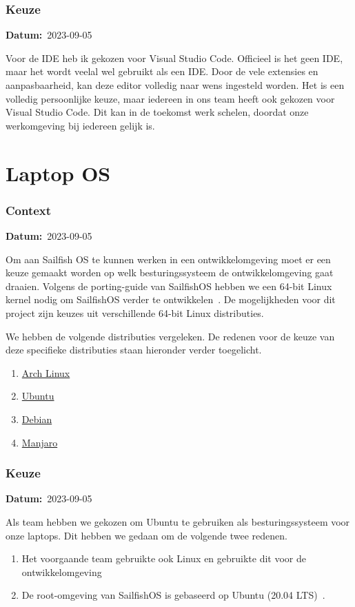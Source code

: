 \documentclass[a4paper]{report}
\newcommand{\personalbox}{
  \begin{tcolorbox}[hbox, colback=green!5!white,colframe=green!75!black,
    left=.1mm, right=.1mm, top=.1mm, bottom=.1mm, fontupper=\scriptsize\sffamily]
    Persoonlijke Keuze
  \end{tcolorbox}
}
\newcommand{\personalchoice}[1]{
  \section[ #1 ]{#1~\mbox{\raisebox{-2.5pt}{\personalbox}}}
}
\newcommand{\timestamp}[1]{
  \mbox{\scriptsize \textbf{Datum:} #1} \smallbreak
}
\begin{document}
\subsubsection{Keuze}
\timestamp{2023-09-05}
Voor de IDE heb ik gekozen voor Visual Studio Code. Officieel is het geen IDE, maar het wordt veelal wel gebruikt als een IDE. 
Door de vele extensies en aanpasbaarheid, kan deze editor volledig naar wens ingesteld worden. 
Het is een volledig persoonlijke keuze, maar iedereen in ons team heeft ook gekozen voor Visual Studio Code.
Dit kan in de toekomst werk schelen, doordat onze werkomgeving bij iedereen gelijk is.

\personalchoice{Laptop OS}
\subsubsection{Context}
\timestamp{2023-09-05}
Om aan Sailfish OS te kunnen werken in een ontwikkelomgeving moet er een keuze gemaakt worden op welk besturingssysteem de ontwikkelomgeving gaat draaien. 
Volgens de porting-guide van SailfishOS hebben we een 64-bit Linux kernel nodig om SailfishOS verder te ontwikkelen~\cite{sailfishportingguide}.
De mogelijkheden voor dit project zijn keuzes uit verschillende 64-bit Linux distributies. 

We hebben de volgende distributies vergeleken. De redenen voor de keuze van deze specifieke distributies staan hieronder verder toegelicht.
\begin{enumerate}
  \item \href{https://archlinux.org/}{Arch Linux}
  \item \href{https://ubuntu.com/}{Ubuntu}
  \item \href{https://www.debian.org/}{Debian}
  \item \href{https://manjaro.org/}{Manjaro}
\end{enumerate}


\subsubsection{Keuze}
\timestamp{2023-09-05}
Als team hebben we gekozen om Ubuntu te gebruiken als besturingssysteem voor onze laptops. 
Dit hebben we gedaan om de volgende twee redenen.
\begin{enumerate}
  \item Het voorgaande team gebruikte ook Linux en gebruikte dit voor de ontwikkelomgeving~\cite{fairphonegithub}
  \item De root-omgeving van SailfishOS is gebaseerd op Ubuntu (20.04 LTS)~\cite{sailfishportingguide}.
\end{enumerate}
\end{document}
